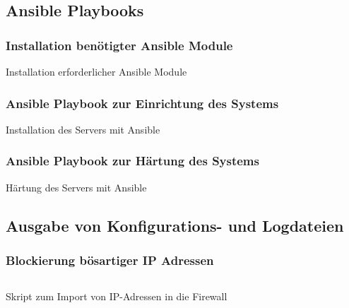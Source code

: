 \subsection{Ansible Playbooks}

\subsubsection{Installation benötigter Ansible Module}
\begin{listing}[ht]
    \caption{Installation erforderlicher Ansible Module}
    \label{listing:ansible_module_installation}
\end{listing}


\subsubsection{Ansible Playbook zur Einrichtung des Systems}
\begin{longlisting}
    \caption{Installation des Servers mit Ansible}
    \label{listing:ansible_playbook}
\end{longlisting}

\subsubsection{Ansible Playbook zur Härtung des Systems}
\begin{longlisting}
    \caption{Härtung des Servers mit Ansible}
    \label{listing:hardening}
\end{longlisting}

\subsection{Ausgabe von Konfigurations- und Logdateien}

\subsubsection{Blockierung bösartiger IP Adressen}\label{kap:fw_abuse}
\begin{longlisting}   
\inputminted[fontfamily=tt,
linenos=true,
numberblanklines=true,
numbersep=5pt,
gobble=0,
frame=leftline,
framerule=0.4pt,
framesep=2mm,
funcnamehighlighting=true,
tabsize=4,
obeytabs=false,
mathescape=false
samepage=false, %
showspaces=false,
showtabs =false,
texcl=false,
breaklines=true]{docker}{code/shell/fw_abuse.sh}
\caption{Skript zum Import von IP-Adressen in die Firewall}
\end{longlisting}

